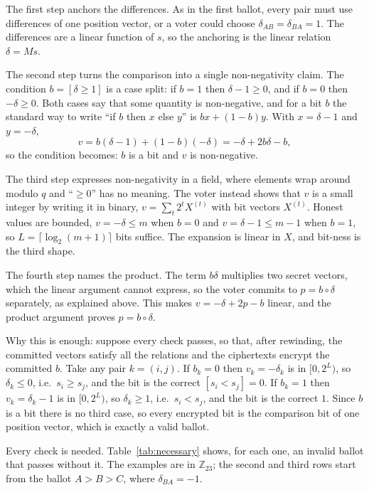 \documentclass[11pt,a4paper]{article}
\newcommand{\Z}{\mathbb{Z}}
\theoremstyle{remark}
\begin{document}
The first step anchors the differences. As in the first ballot, every
pair must use differences of one position vector, or a voter could choose
$\delta_{AB} = \delta_{BA} = 1$. The differences are a linear function of
$s$, so the anchoring is the linear relation $\delta = Ms$.

The second step turns the comparison into a single non-negativity claim.
The condition $b = [\delta \ge 1]$ is a case split: if $b = 1$ then
$\delta - 1 \ge 0$, and if $b = 0$ then $-\delta \ge 0$. Both cases say
that some quantity is non-negative, and for a bit $b$ the standard way to
write ``if $b$ then $x$ else $y$'' is $b x + (1 - b) y$. With $x = \delta -
1$ and $y = -\delta$,
\[
  v = b(\delta - 1) + (1 - b)(-\delta) = -\delta + 2 b \delta - b ,
\]
so the condition becomes: $b$ is a bit and $v$ is non-negative.

The third step expresses non-negativity in a field, where elements wrap
around modulo $q$ and ``$\ge 0$'' has no meaning. The voter instead shows
that $v$ is a small integer by writing it in binary, $v = \sum_t 2^t
X^{(t)}$ with bit vectors $X^{(t)}$. Honest values are bounded, $v = -\delta
\le m$ when $b = 0$ and $v = \delta - 1 \le m - 1$ when $b = 1$, so $L =
\lceil \log_2(m + 1) \rceil$ bits suffice. The expansion is linear in $X$,
and bit-ness is the third shape.

The fourth step names the product. The term $b\delta$ multiplies two secret
vectors, which the linear argument cannot express, so the voter commits to
$p = b \circ \delta$ separately, as explained above. This makes $v =
-\delta + 2p - b$ linear, and the product argument proves $p = b \circ
\delta$.

Why this is enough: suppose every check passes, so that, after rewinding,
the committed vectors satisfy all the relations and the ciphertexts
encrypt the committed $b$. Take any pair $k = (i, j)$. If $b_k = 0$ then
$v_k = -\delta_k$ is in $[0, 2^L)$, so $\delta_k \le 0$, i.e.\ $s_i \ge
s_j$, and the bit is the correct $[s_i < s_j] = 0$. If $b_k = 1$ then $v_k
= \delta_k - 1$ is in $[0, 2^L)$, so $\delta_k \ge 1$, i.e.\ $s_i < s_j$,
and the bit is the correct $1$. Since $b$ is a bit there is no third case,
so every encrypted bit is the comparison bit of one position vector, which
is exactly a valid ballot.

Every check is needed. Table~\ref{tab:necessary} shows, for each one, an
invalid ballot that passes without it. The examples are in $\Z_{23}$;
the second and third rows start from the ballot $A > B > C$, where
$\delta_{BA} = -1$.
\end{document}
